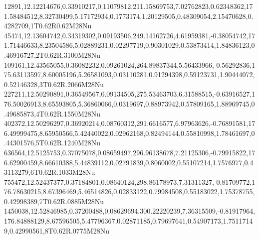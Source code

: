 12891,12.12214676,0.33910217,0.11079812,211.15869753,7.02762823,0.62348362,171.58484512,8.32730499,5.17172934,0.1773174,1.20129505,0.48309054,2.15470628,0.4282709,1T0.62R0.62M28Nu
45474,12.13604742,0.34319302,0.09193506,249.14162726,4.61959381,-0.38054742,171.71446633,8.23504586,5.02889231,0.02297719,0.90301029,0.53873414,1.84836123,0.46916727,2T0.62R.3100M28Nu
109161,12.43565055,0.36082232,0.09261024,264.89837344,5.56433966,-0.56292836,175.63113597,8.60005196,5.26581093,0.03110281,0.91294398,0.59123731,1.90444072,0.52146328,3T0.62R.2066M28Nu
227211,12.50290891,0.36549567,0.09134505,275.53463703,6.31588515,-0.63916527,176.50026913,8.65593805,5.36860066,0.0319697,0.88973942,0.57809165,1.88969745,0.49685873,4T0.62R.1550M28Nu
402372,12.50296297,0.36920214,0.08760312,291.6616577,6.97963626,-0.76891581,176.49999475,8.65950566,5.42440022,0.02962168,0.82494144,0.55810998,1.78461697,0.44301576,5T0.62R.1240M28Nu
636564,12.5125753,0.37075078,0.08659497,296.96138678,7.21125306,-0.79915822,176.62900459,8.66610388,5.44839112,0.02791839,0.8060002,0.55107214,1.7576977,0.43113279,6T0.62R.1033M28Nu
755472,12.52437377,0.37184801,0.08640124,298.86178973,7.31311327,-0.81709772,176.78630215,8.67396469,5.46514826,0.02833122,0.79984508,0.55183022,1.75378755,0.42998389,7T0.62R.0885M28Nu
1450038,12.52846985,0.37200488,0.08629694,300.22220239,7.36315509,-0.81917964,176.84888129,8.67596505,5.47796367,0.02871185,0.79697641,0.54907173,1.75117149,0.42990561,8T0.62R.0775M28Nu
